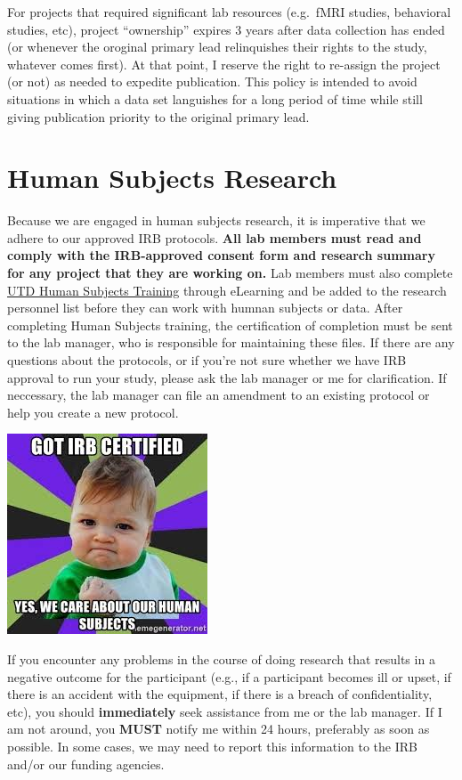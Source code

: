 \documentclass[]{book}
\begin{document}
For projects that required significant lab resources (e.g.~fMRI studies, behavioral studies, etc), project ``ownership'' expires 3 years after data collection has ended (or whenever the oroginal primary lead relinquishes their rights to the study, whatever comes first). At that point, I reserve the right to re-assign the project (or not) as needed to expedite publication. This policy is intended to avoid situations in which a data set languishes for a long period of time while still giving publication priority to the original primary lead.

\hypertarget{human-subjects-research}{%
\section{Human Subjects Research}\label{human-subjects-research}}

Because we are engaged in human subjects research, it is imperative that we adhere to our approved IRB protocols. \textbf{All lab members must read and comply with the IRB-approved consent form and research summary for any project that they are working on.} Lab members must also complete \href{https://research.utdallas.edu/researchers/human-subjects-research/forms-and-resources/training-and-workshops}{UTD Human Subjects Training} through eLearning and be added to the research personnel list before they can work with humnan subjects or data. After completing Human Subjects training, the certification of completion must be sent to the lab manager, who is responsible for maintaining these files. If there are any questions about the protocols, or if you're not sure whether we have IRB approval to run your study, please ask the lab manager or me for clarification. If neccessary, the lab manager can file an amendment to an existing protocol or help you create a new protocol.

\includegraphics{images/human_subjects.jpeg}

If you encounter any problems in the course of doing research that results in a negative outcome for the participant (e.g., if a participant becomes ill or upset, if there is an accident with the equipment, if there is a breach of confidentiality, etc), you should \textbf{immediately} seek assistance from me or the lab manager. If I am not around, you \textbf{MUST} notify me within 24 hours, preferably as soon as possible. In some cases, we may need to report this information to the IRB and/or our funding agencies.
\end{document}

